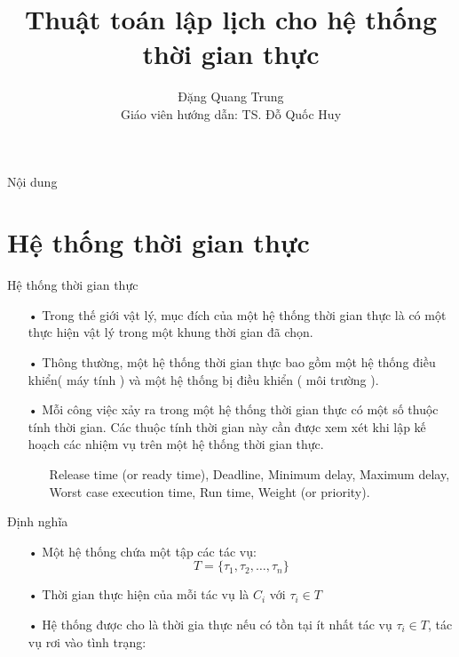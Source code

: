 \documentclass{beamer}
\title[]{{\huge \bf Thuật toán lập lịch cho hệ thống thời gian thực} \\}
\author[Đặng Quang Trung]{
Đặng Quang Trung\\
Giáo viên hướng dẫn: TS. Đỗ Quốc Huy
}
\institute[]{
Hệ Điều Hành \\
}
\begin{document}
\begin{frame}
\titlepage
\end{frame}
\begin{frame}{Nội dung}
\tableofcontents
\end{frame}
\section{Hệ thống thời gian thực}
\begin{frame}{Hệ thống thời gian thực}
\begin{itemize}
\item[•] Trong thế giới vật lý, mục đích của một hệ thống thời gian thực là có một thực hiện vật lý trong một khung thời gian đã chọn.
\item[•] Thông thường, một hệ thống thời gian thực bao gồm một hệ thống điều khiển( máy tính ) và một hệ thống bị điều khiển ( môi trường ).
\item[•] Mỗi công việc xảy ra trong một hệ thống thời gian thực có một số thuộc tính thời gian. Các thuộc tính thời gian này cần được xem xét khi lập kế hoạch các nhiệm vụ trên một hệ thống thời gian thực.
\begin{itemize}
\item[] Release time (or ready time), Deadline, Minimum delay, Maximum delay, Worst case execution time, Run time, Weight (or priority).
\end{itemize}
\end{itemize}
\end{frame}
\begin{frame}{Định nghĩa}
\begin{itemize}
\item[•] Một hệ thống chứa một tập các tác vụ:
\begin{displaymath}
T = \{\tau_1, \tau_2, \ldots, \tau_n\}
\end{displaymath}
\item[•] Thời gian thực hiện của mỗi tác vụ là $C_i$ với $\tau_i \in T$
\item[•]  Hệ thống được cho là thời gia thực nếu có tồn tại ít nhất tác vụ $\tau_i \in T$, tác vụ rơi vào tình trạng:
\end{itemize}
\end{frame}
\end{document}

